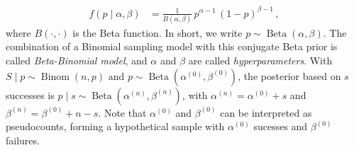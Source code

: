 \documentclass[runningheads,a4paper]{llncs}
\newcommand{\uz}{^{(0)}} %
\newcommand{\un}{^{(n)}} %
\newcommand{\az}{\alpha\uz}
\newcommand{\an}{\alpha\un}
\newcommand{\bz}{\beta\uz}
\newcommand{\bn}{\beta\un}
\newcommand{\bin}{\operatorname{Binom}} %
\newcommand{\be}{\operatorname{Beta}}   %
\begin{document}
\begin{align}
f(p\mid\alpha,\beta) &= \frac{1}{B(\alpha,\beta)}\, p^{\alpha-1}\, (1-p)^{\beta-1}\,,
\label{eq:betadensab}
\end{align}
where $B(\cdot,\cdot)$ is the Beta function.
In short, we write $p \sim \be(\alpha,\beta)$.
The combination of a Binomial sampling model with this conjugate Beta prior is called \emph{Beta-Binomial model},
and $\alpha$ and $\beta$ are called \emph{hyperparameters}.
With $S\mid p \sim \bin(n,p)$ and $p \sim \be(\az,\bz)$, the posterior based on $s$ successes is $p \mid s \sim \be(\an,\bn)$,
with
$\an = \az + s$ and $\bn= \bz + n - s$.
Note that $\az$ and $\bz$ can be interpreted as pseudocounts,
forming a hypothetical sample with $\az$ sucesses and $\bz$ failures.
\fi
\end{document}
